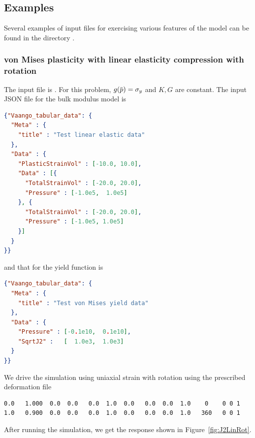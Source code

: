 \subsection{Examples}
Several examples of input files for exercising various features of the
 model can be found in the directory
.

\subsubsection{von Mises plasticity with linear elasticity compression with rotation}
The input file is .
For this problem, $g(\pbar) = \sigma_y$ and $K, G$ are constant. The 
input JSON file for the bulk modulus model is
\begin{lstlisting}[language=JSON]
{"Vaango_tabular_data": {
  "Meta" : {
    "title" : "Test linear elastic data"
  },
  "Data" : {
    "PlasticStrainVol" : [-10.0, 10.0],
    "Data" : [{
      "TotalStrainVol" : [-20.0, 20.0],
      "Pressure" : [-1.0e5,  1.0e5]
    }, {
      "TotalStrainVol" : [-20.0, 20.0],
      "Pressure" : [-1.0e5, 1.0e5]
    }]
  }
}}
\end{lstlisting}
and that for the yield function is
\begin{lstlisting}[language=JSON]
{"Vaango_tabular_data": {
  "Meta" : {
    "title" : "Test von Mises yield data"
  },
  "Data" : {
    "Pressure" : [-0.1e10,  0.1e10],
    "SqrtJ2" :   [  1.0e3,  1.0e3]
  }
}}
\end{lstlisting}
We drive the simulation using uniaxial strain with rotation using the
prescribed deformation file
\begin{lstlisting}[language=sh, backgroundcolor=\color{background}]
0.0   1.000  0.0  0.0   0.0  1.0  0.0   0.0  0.0  1.0    0    0 0 1
1.0   0.900  0.0  0.0   0.0  1.0  0.0   0.0  0.0  1.0   360   0 0 1
\end{lstlisting}
After running the simulation, we get the response shown in Figure~\ref{fig:J2LinRot}.
